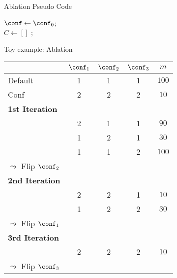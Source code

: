 \begin{frame}[c,fragile]{Ablation Pseudo Code}

\LinesNotNumbered
\begin{algorithm}[H]
\BlankLine
$\conf \leftarrow  \conf_0$; \\
$C \leftarrow [] $ ;\\ 
\pause
{}
\caption{Ablation}
\end{algorithm}

\end{frame}
\begin{frame}[c,fragile]{Toy example: Ablation}

\centering
\small
\begin{tabular}{l ccc c}
\toprule
 		& $\conf_1$ & $\conf_2$ & $\conf_3$ & $m$\\
\midrule
Default & 1 & 1 & 1 & $100$\\
Conf & 2 & 2 & 2 & $10$\\
\hline
\pause
\textbf{1st Iteration}\\
		& 2 & 1 & 1 & $90$ \\
		& 1 & 2 & 1 & $30$ \\
		& 1 & 1 & 2 & $100$ \\
$\leadsto$ Flip $\conf_2$\\
\hline
\pause
\textbf{2nd Iteration}\\
		& 2 & 2 & 1 & $10$ \\
		& 1 & 2 & 2 & $30$ \\
$\leadsto$ Flip $\conf_1$\\
\hline
\pause
\textbf{3rd Iteration}\\
		& 2 & 2 & 2 & $10$ \\
$\leadsto$ Flip $\conf_3$\\
\bottomrule
\end{tabular}

\end{frame}
